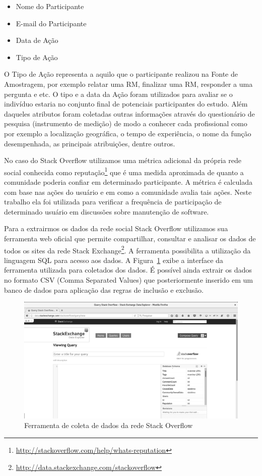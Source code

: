 \begin{itemize}
	\item Nome do Participante
	\item E-mail do Participante
	\item Data de Ação
	\item Tipo de Ação
\end{itemize}

O Tipo de Ação representa a aquilo que o participante realizou na Fonte de
Amostragem, por exemplo relatar uma RM, finalizar uma RM, responder a uma
pergunta e etc. O tipo e a data da Ação foram utilizados para avaliar se o
indivíduo estaria no conjunto final de potenciais participantes do estudo. Além
daqueles atributos foram coletadas outras informações através do questionário de
pesquisa (instrumento de medição) de modo a conhecer cada profissional como por
exemplo a localização geográfica, o tempo de experiência, o nome da função
desempenhada, as principais atribuições, dentre outros.

No caso do Stack Overflow utilizamos uma métrica adicional da própria rede
social conhecida como
reputação\footnote{\url{http://stackoverflow.com/help/whats-reputation}} que é
uma medida aproximada de quanto a comunidade poderia confiar em determinado
participante. A métrica é calculada com base nas ações do usuário e em como a
comunidade avalia tais ações. Neste trabalho ela foi utilizada para verificar
a frequência de participação de determinado usuário em discussões sobre
manutenção de software.

Para a extrairmos os dados da rede social Stack Overflow utilizamos sua
ferramenta web oficial que permite compartilhar, consultar e analisar os dados
de todos os sites da rede Stack
Exchange\footnote{\url{http://data.stackexchange.com/stackoverflow}}. A
ferramenta possibilita a utilização da linguagem SQL para acesso aos dados. A
Figura~\ref{fig:stack-exchange} exibe a interface da ferramenta utilizada para
coletados dos dados. É possível ainda extrair os dados no formato CSV (Comma
Separated Values) que posteriormente inserido em um banco de dados para
aplicação das regras de inclusão e exclusão.

\begin{figure}[htpb]
	\centering
	\includegraphics[width=0.6\linewidth]{./chapter-pesquisa-com-profissionais/img/stack-exchange.png}
	\caption{Ferramenta de coleta de dados da rede Stack Overflow}
\label{fig:stack-exchange}
\end{figure}

